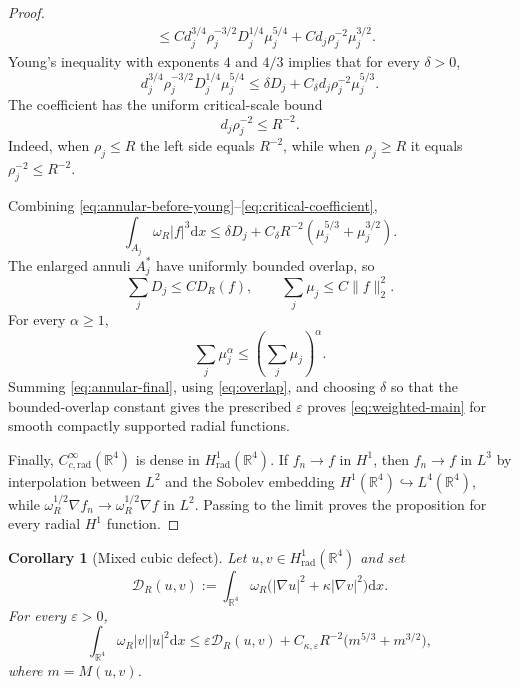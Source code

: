 \documentclass[12pt]{amsart}
\numberwithin{equation}{section}
\newtheorem{corollary}[theorem]{Corollary}
\theoremstyle{remark}
\newcommand{\R}{\mathbb{R}}
\newcommand{\dd}{\mathrm{d}x}
\begin{document}
\begin{proof}
\begin{align}
 &\le C d_j^{3/4}\rho_j^{-3/2}D_j^{1/4}\mu_j^{5/4} +C d_j\rho_j^{-2}\mu_j^{3/2}.
 \label{eq:annular-before-young}
\end{align}
Young's inequality with exponents $4$ and $4/3$ implies that for every $\delta>0$,
\begin{equation}\label{eq:young-annulus}
 d_j^{3/4}\rho_j^{-3/2}D_j^{1/4}\mu_j^{5/4} \le \delta D_j+C_\delta d_j\rho_j^{-2}\mu_j^{5/3}.
\end{equation}
The coefficient has the uniform critical-scale bound
\begin{equation}\label{eq:critical-coefficient}
 d_j\rho_j^{-2}\le R^{-2}.
\end{equation}
Indeed, when $\rho_j\le R$ the left side equals $R^{-2}$, while when $\rho_j\ge R$ it equals $\rho_j^{-2}\le R^{-2}$.

Combining \eqref{eq:annular-before-young}--\eqref{eq:critical-coefficient},
\begin{equation}\label{eq:annular-final}
 \int_{A_j}\omega_R|f|^3\dd \le \delta D_j+C_\delta R^{-2} \left(\mu_j^{5/3}+\mu_j^{3/2}\right).
\end{equation}
The enlarged annuli $A_j^*$ have uniformly bounded overlap, so
\begin{equation}\label{eq:overlap}
 \sum_jD_j\le C D_R(f), \qquad \sum_j\mu_j\le C\|f\|_2^2.
\end{equation}
For every $\alpha\ge1$,
\[
 \sum_j\mu_j^\alpha\le\left(\sum_j\mu_j\right)^\alpha.
\]
Summing \eqref{eq:annular-final}, using \eqref{eq:overlap}, and choosing $\delta$ so that the bounded-overlap constant gives the prescribed $\varepsilon$ proves \eqref{eq:weighted-main} for smooth compactly supported radial functions.

Finally, $C_{c,\mathrm{rad}}^\infty(\R^4)$ is dense in $H^1_{\mathrm{rad}}(\R^4)$.  If $f_n\to f$ in $H^1$, then $f_n\to f$ in $L^3$ by interpolation between $L^2$ and the Sobolev embedding $H^1(\R^4)\hookrightarrow L^4(\R^4)$, while $\omega_R^{1/2}\nabla f_n\to\omega_R^{1/2}\nabla f$ in $L^2$.  Passing to the limit proves the proposition for every radial $H^1$ function.
\end{proof}

\begin{corollary}[Mixed cubic defect]\label{cor:mixed}
Let $u,v\in H^1_{\mathrm{rad}}(\R^4)$ and set
\begin{equation*}
 \mathcal D_R(u,v):=\int_{\R^4}\omega_R \big(|\nabla u|^2+\kappa|\nabla v|^2\big)\dd.
\end{equation*}
For every $\varepsilon>0$,
\begin{equation*}
 \int_{\R^4}\omega_R|v||u|^2\dd \le \varepsilon\mathcal D_R(u,v) +C_{\kappa,\varepsilon}R^{-2} \big(m^{5/3}+m^{3/2}\big),
\end{equation*}
where $m=M(u,v)$.
\end{corollary}
\end{document}
